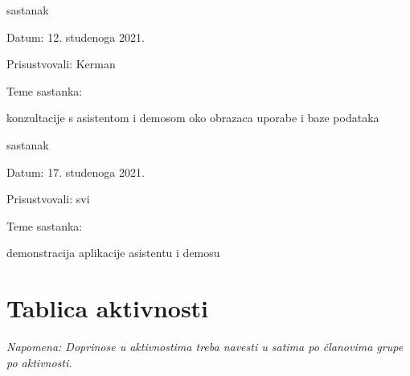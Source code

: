 \begin{packed_enum}
			\item  sastanak
			\item[] \begin{packed_item}
				\item Datum: 12. studenoga 2021.
				\item Prisustvovali: Kerman
				\item Teme sastanka:
				\begin{packed_item}
					\item  konzultacije s asistentom i demosom oko obrazaca uporabe i baze podataka
				\end{packed_item}
			\end{packed_item}
			
			\item  sastanak
			\item[] \begin{packed_item}
				\item Datum: 17. studenoga 2021.
				\item Prisustvovali: svi
				\item Teme sastanka:
				\begin{packed_item}
					\item demonstracija aplikacije asistentu i demosu
				\end{packed_item}
			\end{packed_item}
			
			
		\end{packed_enum}
		
		\eject
		\section*{Tablica aktivnosti}
		
		
			
			 \textit{Napomena: Doprinose u aktivnostima treba navesti u satima po članovima grupe po aktivnosti.}

